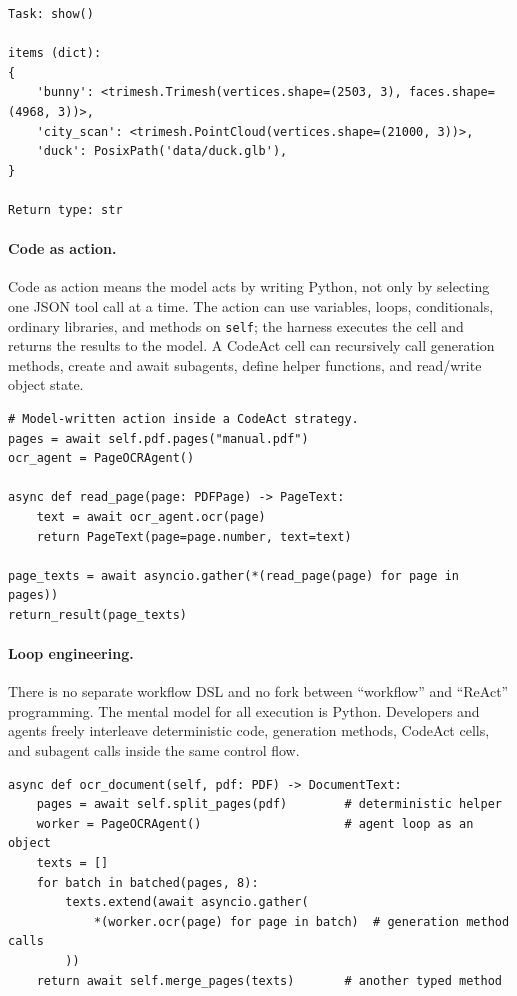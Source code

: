 \documentclass[11pt, logo, onecolumn, copyright, colorlinks=true, allcolors=blue]{nvidiatechreport}
\begin{document}
\begin{lstlisting}
Task: show()

items (dict):
{
    'bunny': <trimesh.Trimesh(vertices.shape=(2503, 3), faces.shape=(4968, 3))>,
    'city_scan': <trimesh.PointCloud(vertices.shape=(21000, 3))>,
    'duck': PosixPath('data/duck.glb'),
}

Return type: str
\end{lstlisting}

\paragraph{Code as action.}
Code as action means the model acts by writing Python, not only by selecting one
JSON tool call at a time.  The action can use variables, loops, conditionals,
ordinary libraries, and methods on \texttt{self}; the harness executes the cell
and returns the results to the model.  A CodeAct cell can recursively call
generation methods, create and await subagents, define helper functions, and
read/write object state.

\begin{lstlisting}
# Model-written action inside a CodeAct strategy.
pages = await self.pdf.pages("manual.pdf")
ocr_agent = PageOCRAgent()

async def read_page(page: PDFPage) -> PageText:
    text = await ocr_agent.ocr(page)
    return PageText(page=page.number, text=text)

page_texts = await asyncio.gather(*(read_page(page) for page in pages))
return_result(page_texts)
\end{lstlisting}

\paragraph{Loop engineering.}
There is no separate workflow DSL and no fork between
``workflow'' and ``ReAct'' programming.  The mental model for all execution is
Python.  Developers and agents freely interleave deterministic code, generation
methods, CodeAct cells, and subagent calls inside the same control flow.

\begin{lstlisting}
async def ocr_document(self, pdf: PDF) -> DocumentText:
    pages = await self.split_pages(pdf)        # deterministic helper
    worker = PageOCRAgent()                    # agent loop as an object
    texts = []
    for batch in batched(pages, 8):
        texts.extend(await asyncio.gather(
            *(worker.ocr(page) for page in batch)  # generation method calls
        ))
    return await self.merge_pages(texts)       # another typed method
\end{lstlisting}
\end{document}
